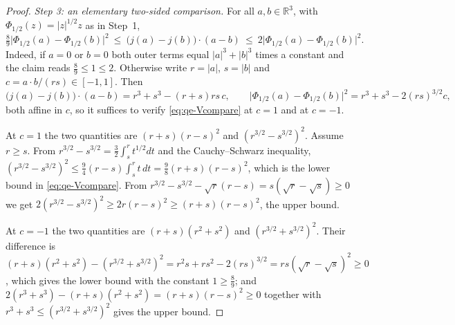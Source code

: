 \documentclass[11pt]{article}
\theoremstyle{definition}
\theoremstyle{plain}
\newcommand{\R}{\mathbb R}
\begin{document}
\begin{proof}
\emph{Step 3: an elementary two-sided comparison.}  For all $a,b\in\R^3$,
with $\Phi_{1/2}(z)=|z|^{1/2}z$ as in Step~1,
\begin{equation}\label{eq:qe-Vcompare}
 \tfrac89\bigl|\Phi_{1/2}(a)-\Phi_{1/2}(b)\bigr|^2
 \ \le\ \bigl(j(a)-j(b)\bigr)\cdot(a-b)
 \ \le\ 2\bigl|\Phi_{1/2}(a)-\Phi_{1/2}(b)\bigr|^2 .
\end{equation}
Indeed, if $a=0$ or $b=0$ both outer terms equal $|a|^3+|b|^3$ times a
constant and the claim reads $\frac89\le1\le2$.  Otherwise write $r=|a|$,
$s=|b|$ and $c=a\cdot b/(rs)\in[-1,1]$.  Then
\[
 \bigl(j(a)-j(b)\bigr)\cdot(a-b)=r^3+s^3-(r+s)rs\,c,
 \qquad
 \bigl|\Phi_{1/2}(a)-\Phi_{1/2}(b)\bigr|^2=r^3+s^3-2(rs)^{3/2}c,
\]
both affine in $c$, so it suffices to verify \eqref{eq:qe-Vcompare} at
$c=1$ and at $c=-1$.

At $c=1$ the two quantities are $(r+s)(r-s)^2$ and $(r^{3/2}-s^{3/2})^2$.
Assume $r\ge s$.  From $r^{3/2}-s^{3/2}=\frac32\int_s^rt^{1/2}dt$ and the
Cauchy--Schwarz inequality,
$(r^{3/2}-s^{3/2})^2\le\frac94(r-s)\int_s^rt\,dt=\frac98(r+s)(r-s)^2$,
which is the lower bound in \eqref{eq:qe-Vcompare}.  From
$r^{3/2}-s^{3/2}-\sqrt r(r-s)=s(\sqrt r-\sqrt s)\ge0$ we get
$2(r^{3/2}-s^{3/2})^2\ge2r(r-s)^2\ge(r+s)(r-s)^2$, the upper bound.

At $c=-1$ the two quantities are $(r+s)(r^2+s^2)$ and
$(r^{3/2}+s^{3/2})^2$.  Their difference is
$(r+s)(r^2+s^2)-(r^{3/2}+s^{3/2})^2=r^2s+rs^2-2(rs)^{3/2}=rs(\sqrt r-\sqrt s)^2\ge0$,
which gives the lower bound with the constant $1\ge\frac89$; and
$2(r^3+s^3)-(r+s)(r^2+s^2)=(r+s)(r-s)^2\ge0$ together with
$r^3+s^3\le(r^{3/2}+s^{3/2})^2$ gives the upper bound.


\end{proof}
\end{document}
